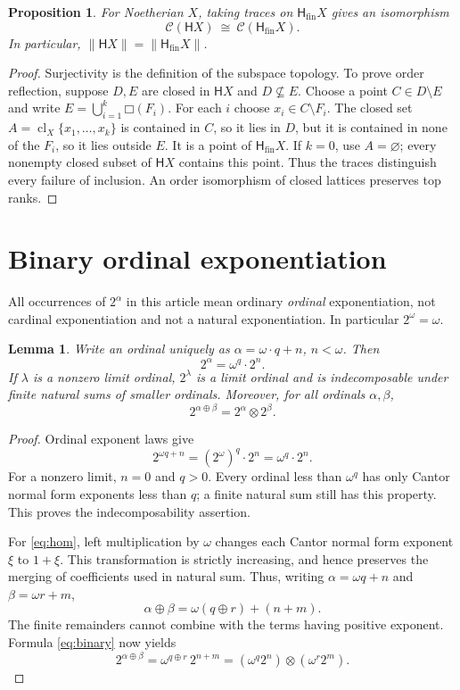 \documentclass[11pt,a4paper]{article}
\newtheorem{lemma}[lemma]{Lemma}
\newtheorem{proposition}[proposition]{Proposition}
\theoremstyle{definition}
\newcommand{\Cl}{\mathcal C}
\newcommand{\HH}{\mathsf H}
\newcommand{\Hfin}{\mathsf H_{\mathrm{fin}}}
\newcommand{\st}[1]{\lVert #1\rVert}
\newcommand{\cl}{\operatorname{cl}}
\newcommand{\boxF}[1]{\mathord{\Box}(#1)}
\numberwithin{equation}{section}
\begin{document}
\begin{proposition}\label{prop:finitary}
For Noetherian $X$, taking traces on $\Hfin X$ gives an isomorphism
\[
 \Cl(\HH X)\ \cong\ \Cl(\Hfin X).
\]
In particular, $\st{\HH X}=\st{\Hfin X}$.
\end{proposition}
\begin{proof}
Surjectivity is the definition of the subspace topology.  To prove order
reflection, suppose $D,E$ are closed in $\HH X$ and $D\nsubseteq E$.
Choose a point $C\in D\setminus E$ and write
$E=\bigcup_{i=1}^k\boxF{F_i}$.  For each $i$ choose
$x_i\in C\setminus F_i$.  The closed set
$A=\cl_X\{x_1,\ldots,x_k\}$ is contained in $C$, so it lies in $D$, but
it is contained in none of the $F_i$, so it lies outside $E$.
It is a point of $\Hfin X$.
If $k=0$, use $A=\varnothing$; every nonempty closed subset of $\HH X$
contains this point.  Thus the traces distinguish every failure of
inclusion.  An order isomorphism of closed lattices preserves top ranks.
\end{proof}

\section{Binary ordinal exponentiation}
\label{sec:ordinal}

All occurrences of $2^\alpha$ in this article mean ordinary
\emph{ordinal} exponentiation, not cardinal exponentiation and not a
natural exponentiation.  In particular $2^\omega=\omega$.

\begin{lemma}\label{lem:binary}
Write an ordinal uniquely as $\alpha=\omega\cdot q+n$, $n<\omega$.
Then
\begin{equation}\label{eq:binary}
 2^\alpha=\omega^q\cdot2^n.
\end{equation}
If $\lambda$ is a nonzero limit ordinal, $2^\lambda$ is a limit ordinal
and is indecomposable under finite natural sums of smaller ordinals.
Moreover, for all ordinals $\alpha,\beta$,
\begin{equation}\label{eq:hom}
 2^{\alpha\oplus\beta}=2^\alpha\otimes2^\beta.
\end{equation}
\end{lemma}
\begin{proof}
Ordinal exponent laws give
\[
 2^{\omega q+n}=(2^\omega)^q\cdot2^n=\omega^q\cdot2^n.
\]
For a nonzero limit, $n=0$ and $q>0$.  Every ordinal less than
$\omega^q$ has only Cantor normal form exponents less than $q$; a finite
natural sum still has this property.  This proves the indecomposability
assertion.

For \eqref{eq:hom}, left multiplication by $\omega$ changes each Cantor
normal form exponent $\xi$ to $1+\xi$.  This transformation is strictly
increasing, and hence preserves the merging of coefficients used in
natural sum.  Thus, writing $\alpha=\omega q+n$ and
$\beta=\omega r+m$,
\[
 \alpha\oplus\beta=\omega(q\oplus r)+(n+m).
\]
The finite remainders cannot combine with the terms having positive
exponent.  Formula \eqref{eq:binary} now yields
\[
 2^{\alpha\oplus\beta}
 =\omega^{q\oplus r}\,2^{n+m}
 =(\omega^q2^n)\otimes(\omega^r2^m).
\]
\end{proof}
\end{document}
